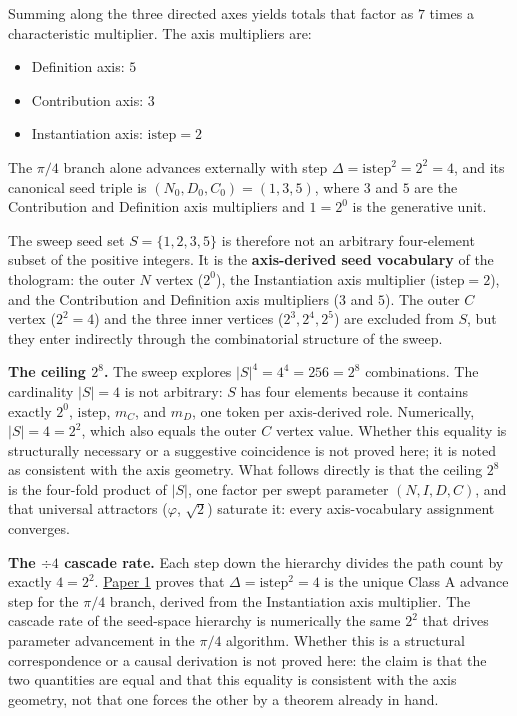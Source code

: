 \documentclass[12pt]{article}
\providecommand{\tightlist}{%
  \setlength{\itemsep}{0pt}\setlength{\parskip}{0pt}}
\begin{document}
Summing along the three directed axes yields totals that factor as \(7\)
times a characteristic multiplier. The axis multipliers are:

\begin{itemize}
\tightlist
\item
  Definition axis: \(5\)
\item
  Contribution axis: \(3\)
\item
  Instantiation axis: \(\mathrm{istep} = 2\)
\end{itemize}

The \(\pi/4\) branch alone advances externally with step
\(\Delta = \mathrm{istep}^2 = 2^2 = 4\), and its canonical seed triple
is \((N_0, D_0, C_0) = (1, 3, 5)\), where \(3\) and \(5\) are the
Contribution and Definition axis multipliers and \(1 = 2^0\) is the
generative unit.

The sweep seed set \(S = \{1, 2, 3, 5\}\) is therefore not an arbitrary
four-element subset of the positive integers. It is the
\textbf{axis-derived seed vocabulary} of the thologram: the outer \(N\)
vertex (\(2^0\)), the Instantiation axis multiplier
(\(\mathrm{istep} = 2\)), and the Contribution and Definition axis
multipliers (\(3\) and \(5\)). The outer \(C\) vertex (\(2^2 = 4\)) and
the three inner vertices (\(2^3, 2^4, 2^5\)) are excluded from \(S\),
but they enter indirectly through the combinatorial structure of the
sweep.

\textbf{The ceiling \(2^8\).} The sweep explores
\(|S|^4 = 4^4 = 256 = 2^8\) combinations. The cardinality \(|S| = 4\) is
not arbitrary: \(S\) has four elements because it contains exactly
\(2^0\), \(\mathrm{istep}\), \(m_C\), and \(m_D\), one token per
axis-derived role. Numerically, \(|S| = 4 = 2^2\), which also equals the
outer \(C\) vertex value. Whether this equality is structurally
necessary or a suggestive coincidence is not proved here; it is noted as
consistent with the axis geometry. What follows directly is that the
ceiling \(2^8\) is the four-fold product of \(|S|\), one factor per
swept parameter \((N, I, D, C)\), and that universal attractors
(\(\varphi\), \(\sqrt{2}\)) saturate it: every axis-vocabulary
assignment converges.

\textbf{The \(\div 4\) cascade rate.} Each step down the hierarchy
divides the path count by exactly \(4 = 2^2\).
\href{https://github.com/baardev/truevalue/blob/main/docnav/Research/papers/1_recursive-tholonic-five-constants/1_recursive-tholonic-five-constants.pdf}{Paper
1} proves that \(\Delta = \mathrm{istep}^2 = 4\) is the unique Class A
advance step for the \(\pi/4\) branch, derived from the Instantiation
axis multiplier. The cascade rate of the seed-space hierarchy is
numerically the same \(2^2\) that drives parameter advancement in the
\(\pi/4\) algorithm. Whether this is a structural correspondence or a
causal derivation is not proved here: the claim is that the two
quantities are equal and that this equality is consistent with the axis
geometry, not that one forces the other by a theorem already in hand.
\end{document}
